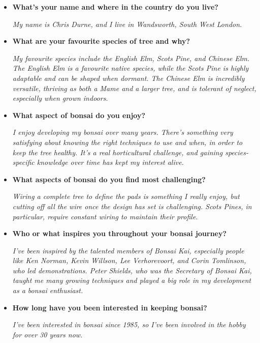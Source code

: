 \begin{itemize}
    \item \textbf{What's your name and where in the country do you live?}

    \emph{My name is Chris Durne, and I live in Wandsworth, South West London.}

    \item \textbf{What are your favourite species of tree and why?}

    \emph{My favourite species include the English Elm, Scots Pine, and Chinese Elm. The English Elm is a favourite native species, while the Scots Pine is highly adaptable and can be shaped when dormant. The Chinese Elm is incredibly versatile, thriving as both a Mame and a larger tree, and is tolerant of neglect, especially when grown indoors.}

    \item \textbf{What aspect of bonsai do you enjoy?}

    \emph{I enjoy developing my bonsai over many years. There's something very satisfying about knowing the right techniques to use and when, in order to keep the tree healthy. It's a real horticultural challenge, and gaining species-specific knowledge over time has kept my interest alive.}

    \item \textbf{What aspects of bonsai do you find most challenging?}

    \emph{Wiring a complete tree to define the pads is something I really enjoy, but cutting off all the wire once the design has set is challenging. Scots Pines, in particular, require constant wiring to maintain their profile.}

    \item \textbf{Who or what inspires you throughout your bonsai journey?}

    \emph{I've been inspired by the talented members of Bonsai Kai, especially people like Ken Norman, Kevin Willson, Lee Verhorevoort, and Corin Tomlinson, who led demonstrations. Peter Shields, who was the Secretary of Bonsai Kai, taught me many growing techniques and played a big role in my development as a bonsai enthusiast.}

    \item \textbf{How long have you been interested in keeping bonsai?}

    \emph{I've been interested in bonsai since 1985, so I've been involved in the hobby for over 30 years now.}


\end{itemize}
